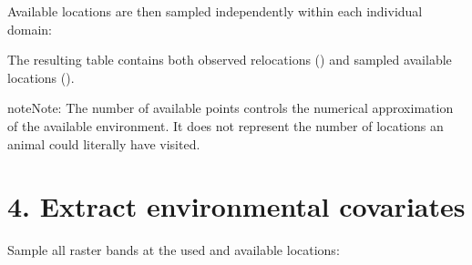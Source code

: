 \documentclass[letterpaper,10pt,english]{sphinxmanual}
\begin{document}
\begin{sphinxVerbatim}[commandchars=\\\{\}]
  

\end{sphinxVerbatim}

\sphinxAtStartPar
Available locations are then sampled independently within each individual domain:

\begin{sphinxVerbatim}[commandchars=\\\{\}]
  

\PYG{p}{[}\PYG{p}{]}
\end{sphinxVerbatim}

\sphinxAtStartPar
The resulting table contains both observed relocations () and sampled available locations ().

\begin{sphinxadmonition}{note}{Note:}
\sphinxAtStartPar
The number of available points controls the numerical approximation of the available environment. It does not represent the number of locations an animal could literally have visited.
\end{sphinxadmonition}


\section{4. Extract environmental covariates}
\label{\detokenize{getting_started:extract-environmental-covariates}}
\sphinxAtStartPar
Sample all raster bands at the used and available locations:
\end{document}
